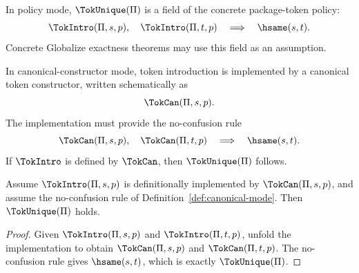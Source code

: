 \begin{definition}
\label{def:policy-mode}
In policy mode, \(\TokUnique(\Pi)\) is a field of the concrete package-token policy:
$$
  \TokIntro(\Pi,s,p),\quad \TokIntro(\Pi,t,p)
  \quad\Longrightarrow\quad
  \hsame(s,t).
$$
Concrete Globalize exactness theorems may use this field as an assumption.
\end{definition}

\begin{definition}
\label{def:canonical-mode}
In canonical-constructor mode, token introduction is implemented by a canonical token constructor, written schematically as
$$
  \TokCan(\Pi,s,p).
$$
The implementation must provide the no-confusion rule
$$
  \TokCan(\Pi,s,p),\quad \TokCan(\Pi,t,p)
  \quad\Longrightarrow\quad
  \hsame(s,t).
$$
If \(\TokIntro\) is defined by \(\TokCan\), then \(\TokUnique(\Pi)\) follows.
\end{definition}

\begin{lemma}
\label{lem:canonical-implies-unique}
Assume \(\TokIntro(\Pi,s,p)\) is definitionally implemented by \(\TokCan(\Pi,s,p)\), and assume the no-confusion rule of Definition~\ref{def:canonical-mode}. Then \(\TokUnique(\Pi)\) holds.
\end{lemma}

\begin{proof}
Given \(\TokIntro(\Pi,s,p)\) and \(\TokIntro(\Pi,t,p)\), unfold the implementation to obtain \(\TokCan(\Pi,s,p)\) and \(\TokCan(\Pi,t,p)\). The no-confusion rule gives \(\hsame(s,t)\), which is exactly \(\TokUnique(\Pi)\).
\end{proof}

